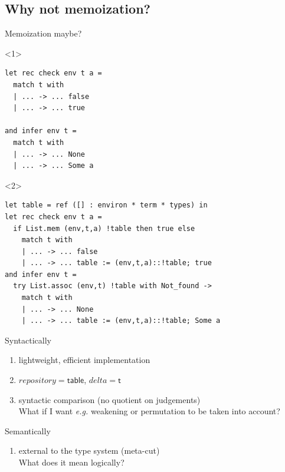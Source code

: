 \documentclass[ignorenonframetext,red]{beamer}
\begin{document}
\subsection{Why not memoization?}

\begin{frame}[fragile]{Memoization maybe?}
  \begin{onlyenv}<1>
    \vspace{4em}
\begin{lstlisting}
let rec check env t a = 
  match t with
  | ... -> ... false
  | ... -> ... true

and infer env t =
  match t with 
  | ... -> ... None
  | ... -> ... Some a
\end{lstlisting}
  \end{onlyenv}
  \begin{onlyenv}<2>
    \vspace{3em}
\begin{lstlisting}
let table = ref ([] : environ * term * types) in
let rec check env t a = 
  if List.mem (env,t,a) !table then true else
    match t with
    | ... -> ... false
    | ... -> ... table := (env,t,a)::!table; true
and infer env t =
  try List.assoc (env,t) !table with Not_found ->
    match t with 
    | ... -> ... None
    | ... -> ... table := (env,t,a)::!table; Some a
\end{lstlisting}
  \end{onlyenv}
  \pause\pause
  \begin{block}{Syntactically}
    \begin{enumerate}
    \item[\itplus] lightweight, efficient implementation
      \pause
    \item[\itplus] $repository = \mathsf{table}$, $delta =
      \mathsf{t}$
      \pause
    \item [\itminus] syntactic comparison (no quotient on judgements) \\
    {\footnotesize What if I want \emph{e.g.} weakening or
      permutation to be taken into account?}
    \end{enumerate}
  \end{block}
  \pause
  \vspace{-1em}
  \begin{block}{Semantically}
    \begin{enumerate}
    \item[\itminus] external to the type system (meta-cut) \\
      {\footnotesize What does it mean logically?
}
\end{enumerate}
\end{block}
\end{frame}
\end{document}
